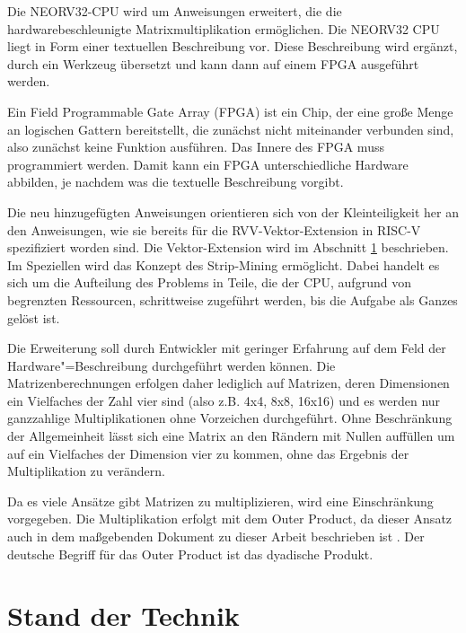 Die NEORV32-CPU wird um Anweisungen erweitert, die die hardwarebeschleunigte Matrixmultiplikation ermöglichen. Die NEORV32 CPU liegt in Form einer textuellen Beschreibung vor. Diese Beschreibung wird ergänzt, durch ein Werkzeug übersetzt und kann dann auf einem FPGA ausgeführt werden.

Ein Field Programmable Gate Array (FPGA) ist ein Chip, der eine große Menge an logischen Gattern bereitstellt, die zunächst nicht miteinander verbunden sind, also zunächst keine Funktion ausführen. Das Innere des FPGA muss programmiert werden. Damit kann ein FPGA unterschiedliche Hardware abbilden, je nachdem was die textuelle Beschreibung vorgibt.

Die neu hinzugefügten Anweisungen orientieren sich von der Kleinteiligkeit her an den Anweisungen, wie sie bereits für die \gls{RVV}-Vektor-Extension in RISC-V spezifiziert worden sind. Die Vektor-Extension wird im Abschnitt \ref{sec:Stand_der_Technik_Main} beschrieben. Im Speziellen wird das Konzept des Strip-Mining ermöglicht. Dabei handelt es sich um die Aufteilung des Problems in Teile, die der CPU, aufgrund von begrenzten Ressourcen, schrittweise zugeführt werden, bis die Aufgabe als Ganzes gelöst ist.

Die Erweiterung soll durch Entwickler mit geringer Erfahrung auf dem Feld der Hardware"=Beschreibung durchgeführt werden können. Die Matrizenberechnungen erfolgen daher lediglich auf Matrizen, deren Dimensionen ein Vielfaches der Zahl vier sind (also z.B. 4x4, 8x8, 16x16) und es werden nur ganzzahlige Multiplikationen ohne Vorzeichen durchgeführt. Ohne Beschränkung der Allgemeinheit lässt sich eine Matrix an den Rändern mit Nullen auffüllen um auf ein Vielfaches der Dimension vier zu kommen, ohne das Ergebnis der Multiplikation zu verändern.

Da es viele Ansätze gibt Matrizen zu multiplizieren, wird eine Einschränkung vorgegeben. Die Multiplikation erfolgt mit dem Outer Product, da dieser Ansatz auch in dem maßgebenden Dokument zu dieser Arbeit beschrieben ist \cite{design_VME}. Der deutsche Begriff für das Outer Product ist das dyadische Produkt.




\section{Stand der Technik} \label{sec:Stand_der_Technik_Main}

%





